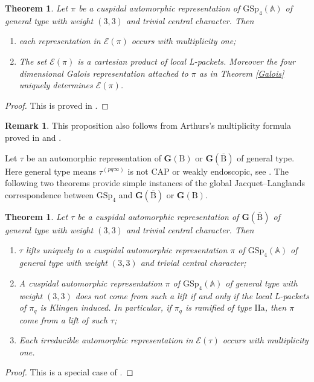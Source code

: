 \documentclass[10pt]{amsart}
\numberwithin{equation}{section}
\newtheorem{theorem}[equation]{Theorem}
\theoremstyle{definition}
\newtheorem{remark}[equation]{Remark}
\def\GSp{\mathrm{GSp}}
\def\calE{\mathcal{E}}
\def\bfG{\mathbf{G}}
\def\rmB{\mathrm{B}}
\begin{document}
\begin{theorem}\label{mult1}
Let $\pi$ be a cuspidal automorphic representation of $\GSp_{4}(\mathbb{A})$ of general type with weight $(3, 3)$ and trivial central character.  Then 
\begin{enumerate}
\item each representation in $\calE(\pi)$ occurs with multiplicity one;
\item The set $\calE(\pi)$ is a cartesian product of local L-packets. Moreover the four dimensional Galois representation attached to $\pi$ as in Theorem \ref{Galois} uniquely determines $\calE(\pi)$.
\end{enumerate}
\end{theorem}
\begin{proof}
This is proved in \cite[Proposition 10.1]{RW}.
\end{proof}
\begin{remark}
This proposition also follows from Arthurs's multiplicity formula proved in \cite{Arthur-GSp} and \cite{GT19}.
\end{remark}

Let $\tau$ be an automorphic representation of $\bfG(\rmB)$ or $\bfG(\overline{\rmB})$ of general type. Here general type means $\tau^{(pq\infty)}$ is not CAP or weakly endoscopic, see \cite[\S 11]{RW}. The following two theorems provide simple instances of the global Jacquet--Langlands correspondence between $\GSp_{4}$ and $\bfG(\overline{\rmB})$ or $\bfG({\rmB})$.
\begin{theorem}\label{mult1-definite}
Let $\tau$ be a cuspidal automorphic representation of $\bfG(\overline{\rmB})$ of general type with weight $(3, 3)$ and trivial central character. Then
\begin{enumerate}
\item $\tau$ lifts uniquely to a cuspidal automorphic representation $\pi$ of $\GSp_{4}(\mathbb{A})$ of general type with weight $(3, 3)$ and trivial central character;
\item A cuspidal automorphic representation $\pi$ of $\GSp_{4}(\mathbb{A})$ of general type with weight $(3, 3)$ does not come from such a lift if and only if the local L-packets of $\pi_{q}$ is Klingen induced. In particular, if $\pi_{q}$ is ramified of type $\mathrm{IIa}$, then $\pi$ come from a lift of such $\tau$;
\item Each irreducible automorphic representation in $\calE(\tau)$ occurs with multiplicity one.
\end{enumerate}
\end{theorem}
\begin{proof}
This is a special case of  \cite[Theorem 11.4]{RW}.
\end{proof}
\end{document}
